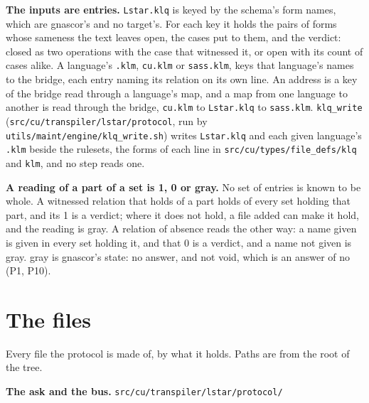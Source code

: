 \textbf{The inputs are entries.} \texttt{Lstar.\allowbreak{}klq} is keyed by the schema's form names, which are gnascor's and no target's. For each key it holds the pairs of forms whose sameness the text leaves open, the cases put to them, and the verdict: closed as two operations with the case that witnessed it, or open with its count of cases alike. A language's \texttt{.\allowbreak{}klm}, \texttt{cu.\allowbreak{}klm} or \texttt{sass.\allowbreak{}klm}, keys that language's names to the bridge, each entry naming its relation on its own line. An address is a key of the bridge read through a language's map, and a map from one language to another is read through the bridge, \texttt{cu.\allowbreak{}klm} to \texttt{Lstar.\allowbreak{}klq} to \texttt{sass.\allowbreak{}klm}. \texttt{klq\_\allowbreak{}write} (\texttt{src/\allowbreak{}cu/\allowbreak{}transpiler/\allowbreak{}lstar/\allowbreak{}protocol}, run by \texttt{utils/\allowbreak{}maint/\allowbreak{}engine/\allowbreak{}klq\_\allowbreak{}write.\allowbreak{}sh}) writes \texttt{Lstar.\allowbreak{}klq} and each given language's \texttt{.\allowbreak{}klm} beside the rulesets, the forms of each line in \texttt{src/\allowbreak{}cu/\allowbreak{}types/\allowbreak{}file\_\allowbreak{}defs/\allowbreak{}klq} and \texttt{klm}, and no step reads one.

\textbf{A reading of a part of a set is 1, 0 or gray.} No set of entries is known to be whole. A witnessed relation that holds of a part holds of every set holding that part, and its 1 is a verdict; where it does not hold, a file added can make it hold, and the reading is gray. A relation of absence reads the other way: a name given is given in every set holding it, and that 0 is a verdict, and a name not given is gray. gray is gnascor's state: no answer, and not void, which is an answer of no (P1, P10).

\section{\texorpdfstring{The files}{The files}}

Every file the protocol is made of, by what it holds. Paths are from the root of the tree.

\textbf{The ask and the bus.} \texttt{src/\allowbreak{}cu/\allowbreak{}transpiler/\allowbreak{}lstar/\allowbreak{}protocol/\allowbreak{}}

